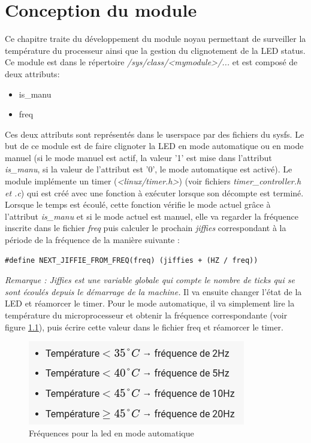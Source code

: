 \documentclass{ReportTemplate}
\begin{document}
\chapter{Conception du module}
Ce chapitre traite du développement du module noyau permettant de surveiller la
température du processeur ainsi que la gestion du clignotement de la LED status.
Ce module est dans le répertoire \textit{/sys/class/<mymodule>/...} et est composé de deux attributs:
\begin{itemize}
    \item is\_manu
    \item freq
\end{itemize}
Ces deux attributs sont représentés dans le userspace par des fichiers du sysfs.
Le but de ce module est de faire clignoter la LED en mode automatique ou en mode
manuel (si le mode manuel est actif, la valeur '1' est mise dans l'attribut
\textit{is\_manu}, si la valeur de l'attribut est '0', le mode automatique est activé). Le module implémente
un timer (\textit{<linux/timer.h>}) (voir fichiers \textit{timer\_controller.h
et .c}) qui est créé avec une fonction à exécuter lorsque son décompte est
terminé. Lorsque le temps est écoulé, cette fonction vérifie le mode actuel grâce à
l'attribut \textit{is\_manu} et si le
mode actuel est manuel, elle va regarder la fréquence inscrite dans le fichier
\textit{freq} puis calculer le prochain \textit{jiffies} correspondant à la
période de la fréquence de la manière suivante :
\begin{verbatim}
#define NEXT_JIFFIE_FROM_FREQ(freq) (jiffies + (HZ / freq))
\end{verbatim}
\textit{Remarque : Jiffies est une variable globale qui compte le nombre de
ticks qui se sont écoulés depuis le démarrage de la machine.}\newline
Il va ensuite changer l'état de la LED et réamorcer le timer.\newline
Pour le mode automatique, il va simplement lire la température du
microprocesseur et obtenir la fréquence correspondante (voir figure
\ref{fig:ledFrequencies}), puis écrire cette valeur dans le fichier freq et
réamorcer le timer.
\begin{figure}[H]
    \includegraphics[width= \textwidth]{imageSources/Led_Frequencies.png}
    \caption{Fréquences pour la led en mode automatique}
    \label{fig:ledFrequencies}
\end{figure}
\end{document}
